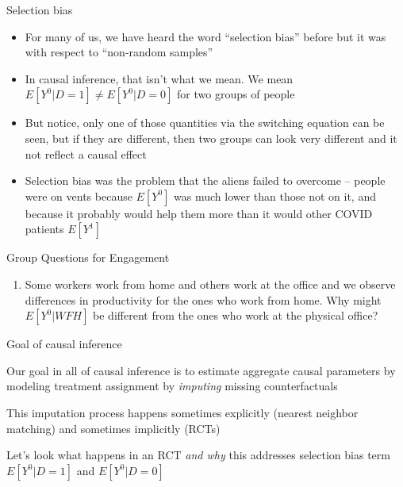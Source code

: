 \documentclass{beamer}
\begin{document}
\begin{frame}{Selection bias}

\begin{itemize}
\item For many of us, we have heard the word ``selection bias'' before but it was with respect to ``non-random samples''
\item In causal inference, that isn't what we mean.  We mean $E[Y^0|D=1] \neq E[Y^0 |D=0]$ for two groups of people
\item But notice, only one of those quantities via the switching equation can be seen, but if they are different, then two groups can look very different and it not reflect a causal effect
\item Selection bias was the problem that the aliens failed to overcome -- people were on vents because $E[Y^0]$ was much lower than those not on it, and because it probably would help them more than it would other COVID patients $E[Y^1]$
\end{itemize}

\end{frame}


\begin{frame}{Group Questions for Engagement}

\begin{enumerate}
\item Some workers work from home and others work at the office and we observe differences in productivity for the ones who work from home. Why might $E[Y^0|WFH]$ be different from the ones who work at the physical office?
\end{enumerate}

\end{frame}


\begin{frame}{Goal of causal inference}

  Our goal in all of causal inference is to estimate aggregate causal parameters by modeling treatment assignment by \emph{imputing} missing counterfactuals

  \bigskip

This imputation process happens sometimes explicitly (nearest neighbor matching) and sometimes implicitly (RCTs)

  \bigskip

  Let's look what happens in an RCT \emph{and why} this addresses selection bias term $E[Y^0|D=1]$ and $E[Y^0|D=0]$

\end{frame}
\end{document}
